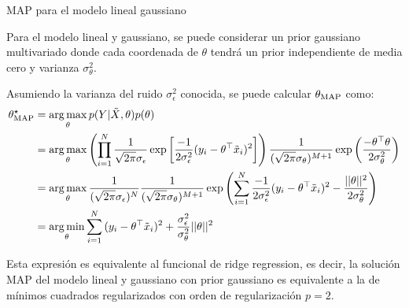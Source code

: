 \documentclass[9pt, handout]{beamer}
\begin{document}
\begin{frame}{MAP para el modelo lineal gaussiano}

Para el modelo lineal y gaussiano, se puede considerar un prior gaussiano multivariado donde cada coordenada de $\theta$ tendrá un prior independiente de media cero y varianza $\sigma_\theta^2$.\\ \pause

Asumiendo la varianza del ruido $\sigma_\epsilon^2$ conocida, se puede calcular $\theta_\text{MAP}$ como:
\begin{align}
	\theta_\text{MAP}^\star 	&= \operatorname*{arg\,max}_\theta p(Y|\tilde{X},\theta)p(\theta)\nonumber\\
	&= \operatorname*{arg\,max}_\theta \left(\prod_{i=1}^N \frac{1}{\sqrt{2\pi}\sigma_\epsilon} \exp\left[{\frac{-1}{2\sigma_\epsilon^2}(y_i-\theta^\top\tilde{x}_i)^2}\right]\right)									\frac{1}{(\sqrt{2\pi}\sigma_\theta)^{M+1}} \exp\left({\frac{-\theta^\top\theta}{2\sigma_\theta^2}}\right) \nonumber\\
	&= \operatorname*{arg\,max}_\theta  \frac{1}{(\sqrt{2\pi}\sigma_\epsilon)^N} \frac{1}{(\sqrt{2\pi}\sigma_\theta)^{M+1}} \exp\left( \sum_{i=1}^N{\frac{-1}{2\sigma_\epsilon^2}(y_i-\theta^\top\tilde{x}_i)^2} -{\frac{||\theta||^2}{2\sigma_\theta^2}}\right) \nonumber\\
	&= \operatorname*{arg\,min}_\theta \sum_{i=1}^N{(y_i-\theta^\top\tilde{x}_i)^2} +{\frac{\sigma_\epsilon^2}{\sigma_\theta^2}||\theta||^2}\nonumber
\end{align}\pause

Esta expresión es equivalente al funcional de ridge regression, es decir, la solución MAP del modelo lineal y gaussiano con prior gaussiano es equivalente a la de mínimos cuadrados regularizados con orden de  regularización $p=2$.\\

\end{frame}
\end{document}
